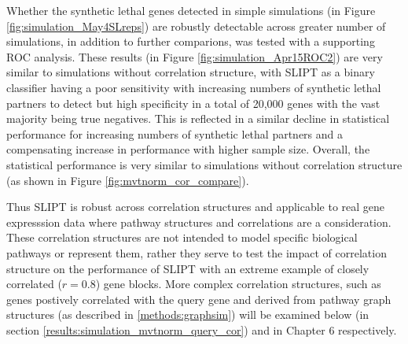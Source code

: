 Whether the synthetic lethal genes detected in simple simulations (in Figure \ref{fig:simulation_May4SLreps}) are robustly detectable across greater number of simulations, in addition to further comparions, was tested with a supporting ROC analysis. These results (in Figure \ref{fig:simulation_Apr15ROC2}) are very similar to simulations without correlation structure, with SLIPT as a binary classifier having a poor sensitivity with increasing numbers of synthetic lethal partners to detect but high specificity in a total of 20,000 genes with the vast majority being true negatives. This is reflected in a similar decline in statistical performance for increasing numbers of synthetic lethal partners and a compensating increase in performance with higher sample size. Overall, the statistical performance is very similar to simulations without correlation structure (as shown in Figure \ref{fig:mvtnorm_cor_compare}).

Thus SLIPT is robust across correlation structures and applicable to real gene expresssion data where pathway structures and correlations are a consideration. These correlation structures are not intended to model specific biological pathways or represent them, rather they serve to test the impact of correlation structure on the performance of SLIPT with an extreme example of closely correlated ($r = 0.8$) gene blocks. More complex correlation structures, such as genes postively correlated with the query gene and derived from pathway graph structures (as described in \ref{methods:graphsim}) will be examined below (in section \ref{results:simulation_mvtnorm_query_cor}) and in Chapter 6 respectively.

